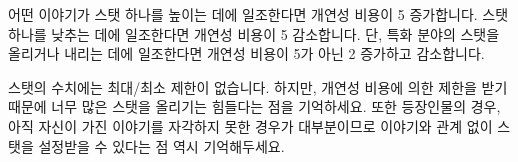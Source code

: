 \documentclass{report}
\begin{document}
	\bigskip
	
	어떤 이야기가 스탯 하나를 높이는 데에 일조한다면 개연성 비용이 5 증가합니다. 스탯 하나를 낮추는 데에 일조한다면 개연성 비용이 5 감소합니다.
	단, 특화 분야의 스탯을 올리거나 내리는 데에 일조한다면 개연성 비용이 5가 아닌 2 증가하고 감소합니다.
	
	\bigskip
	
	스탯의 수치에는 최대/최소 제한이 없습니다. 하지만, 개연성 비용에 의한 제한을 받기 때문에 너무 많은 스탯을 올리기는 힘들다는 점을 기억하세요. 또한 등장인물의 경우, 아직 자신이 가진 이야기를 자각하지 못한 경우가 대부분이므로 이야기와 관계 없이 스탯을 설정받을 수 있다는 점 역시 기억해두세요.
	
\end{document}
